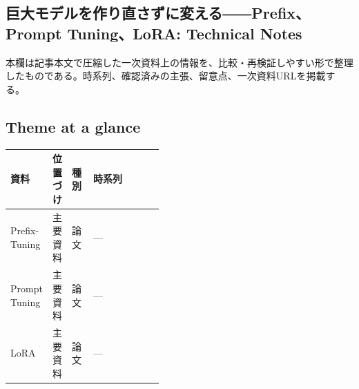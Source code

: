 \subsection*{巨大モデルを作り直さずに変える――Prefix、Prompt Tuning、LoRA: Technical Notes}
本欄は記事本文で圧縮した一次資料上の情報を、比較・再検証しやすい形で整理したものである。時系列、確認済みの主張、留意点、一次資料URLを掲載する。
\medskip
\subsection*{Theme at a glance}
\begin{center}
\footnotesize
\begin{tabularx}{\linewidth}{@{}p{0.20\linewidth}p{0.10\linewidth}p{0.14\linewidth}X@{}}
\toprule
資料 & 位置づけ & 種別 & 時系列 \\
\midrule
Prefix-Tuning & 主要資料 & 論文 & — \\
Prompt Tuning & 主要資料 & 論文 & — \\
LoRA & 主要資料 & 論文 & — \\
\bottomrule
\end{tabularx}
\end{center}
\normalsize

